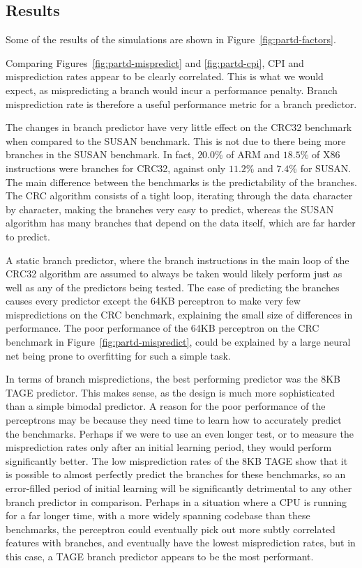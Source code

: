 \subsection{Results}

Some of the results of the simulations are shown in Figure~\ref{fig:partd-factors}.

Comparing Figures~\ref{fig:partd-mispredict} and \ref{fig:partd-cpi}, CPI and
misprediction rates appear to be clearly correlated. This is what we would expect, as
mispredicting a branch would incur a performance penalty. Branch misprediction rate is
therefore a useful performance metric for a branch predictor.

The changes in branch predictor have very little effect on the CRC32
benchmark when compared to the SUSAN benchmark. This is not due to there being more
branches in the SUSAN benchmark. In fact, \(20.0\%\) of ARM and \(18.5\%\) of X86
instructions were branches for CRC32, against only \(11.2\%\) and \(7.4\%\) for SUSAN.
The main difference between the benchmarks is the predictability of the branches.
The CRC algorithm
consists of a tight loop, iterating through the data character by character,
making the branches very easy to predict, whereas the SUSAN algorithm has
many branches that depend on the data itself, which are far harder to predict.

A static branch predictor, where the branch instructions in the main loop of the CRC32
algorithm are assumed to always be taken would likely perform just as well as any of
the predictors being tested.
The ease of predicting the branches causes every predictor except the 64KB perceptron
to make very few mispredictions on the CRC benchmark, explaining the small size of
differences in performance.
The poor performance of the 64KB perceptron
on the CRC benchmark in Figure~\ref{fig:partd-mispredict}, could be explained
by a large neural net being prone to overfitting for such a simple task.~\cite{Engin2004,Culpepper2005}

In terms of branch mispredictions, the best performing predictor was the 8KB TAGE
predictor. This makes sense, as the design is much more sophisticated than a simple
bimodal predictor.
A reason for the poor performance of the perceptrons may be because they need time to learn
how to accurately predict the benchmarks. Perhaps if we were to use an even longer test,
or to measure the misprediction rates only after an initial learning period, they would
perform significantly better. The low misprediction rates of the 8KB TAGE show that it
is possible to almost perfectly predict the branches for these benchmarks, so an error-filled
period of initial learning will be significantly detrimental to any other branch predictor
in comparison.
Perhaps in a situation where a CPU is running for a far longer time, with a more
widely spanning codebase than these benchmarks, the perceptron could
eventually pick out more subtly correlated features with branches, and eventually
have the lowest misprediction rates, but in this case, a TAGE branch predictor
appears to be the most performant.



